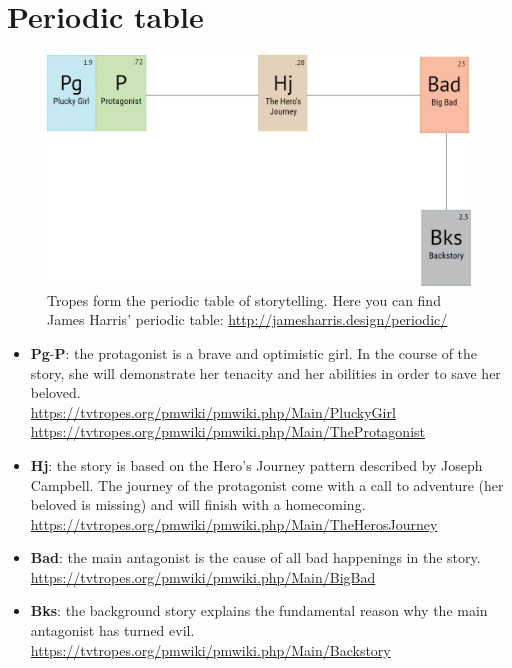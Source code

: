 \section{Periodic table}

\begin{figure}[H]
  \centering
  \includegraphics[width=\textwidth]{Images/Diagrams/periodicTable}
  \caption{Tropes form the periodic table of storytelling. Here you can find James Harris' periodic table: \url{http://jamesharris.design/periodic/}}
\end{figure}

\begin{itemize}
\item \textbf{Pg}-\textbf{P}: the protagonist is a brave and optimistic girl. In the course of the story, she will demonstrate her tenacity and her abilities in order to save her beloved.\\
\url{https://tvtropes.org/pmwiki/pmwiki.php/Main/PluckyGirl}\\
\url{https://tvtropes.org/pmwiki/pmwiki.php/Main/TheProtagonist}

\item \textbf{Hj}: the story is based on the Hero's Journey pattern described by Joseph Campbell. The journey of the protagonist come with a call to adventure (her beloved is missing) and will finish with a homecoming.\\
\url{https://tvtropes.org/pmwiki/pmwiki.php/Main/TheHerosJourney}

\item \textbf{Bad}: the main antagonist is the cause of all bad happenings in the story.\\
\url{https://tvtropes.org/pmwiki/pmwiki.php/Main/BigBad}

\item \textbf{Bks}: the background story explains the fundamental reason why the main antagonist has turned evil.\\
\url{https://tvtropes.org/pmwiki/pmwiki.php/Main/Backstory}
\end{itemize}
